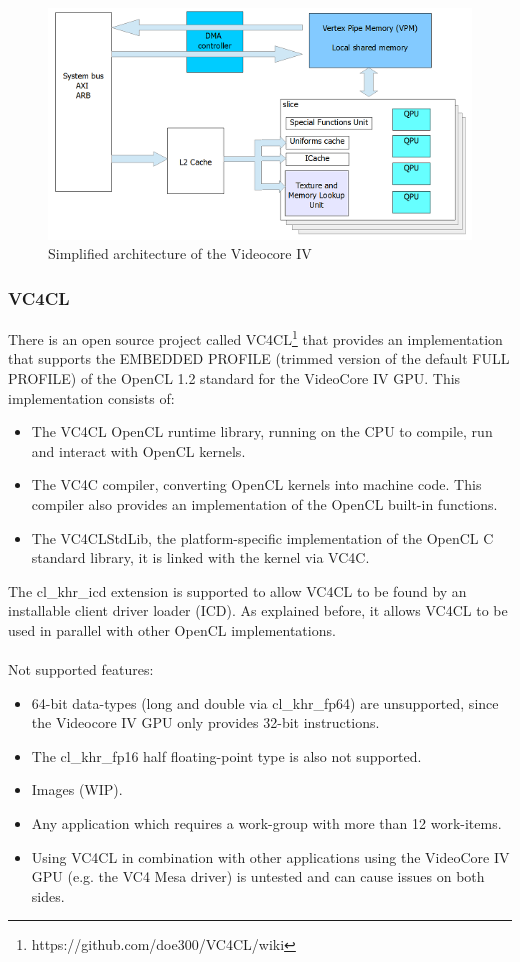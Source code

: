 \documentclass[12pt,a4paper,oneside]{article}
\begin{document}
\begin{figure}[H]
\centering
  \includegraphics[scale=1]{img/vc4_qpu.png}
  \caption{Simplified architecture of the Videocore IV}
  \label{fig:html_output}
\end{figure}

\subsubsection*{VC4CL}
There is an open source project called VC4CL\footnote{https://github.com/doe300/VC4CL/wiki}
that provides an implementation that supports the EMBEDDED PROFILE (trimmed
version of the default FULL PROFILE) of the OpenCL 1.2 standard for the VideoCore
IV GPU. This implementation consists of:
\begin{itemize}
    \item The VC4CL OpenCL runtime library, running on the CPU to compile,
    run and interact with OpenCL kernels.
    \item The VC4C compiler, converting OpenCL kernels into machine code. This
    compiler also provides an implementation of the OpenCL built-in functions.
    \item The VC4CLStdLib, the platform-specific implementation of the OpenCL C
    standard library, it is linked with the kernel via VC4C.
\end{itemize}
The {\selectfont cl\_khr\_icd} extension is supported to allow
VC4CL to be found by an installable client driver loader (ICD). As explained
before, it allows VC4CL to be used in parallel with other OpenCL implementations.
\\\\
Not supported features:
\begin{itemize}
  \item 64-bit data-types (long and double via {\selectfont cl\_khr\_fp64})
  are unsupported, since the Videocore IV GPU only provides 32-bit instructions.
  \item The {\selectfont cl\_khr\_fp16} half floating-point type is
  also not supported.
  \item Images (WIP).
  \item Any application which requires a work-group with more than 12 work-items.
  \item Using VC4CL in combination with other applications using the VideoCore IV
  GPU (e.g. the VC4 Mesa driver) is untested and can cause issues on both sides.
\end{itemize}
\end{document}
